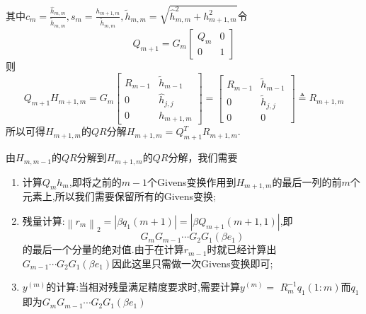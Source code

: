 \documentclass[12pt,a4paper]{article}
\begin{document}
\begin{enumerate}[(1)]
$$	$$
	其中$c_{m}=\frac{\hat{h}_{m, m}}{\tilde{h}_{m, m}}, s_{m}=\frac{h_{m+1, m}}{\tilde{h}_{m, m}}, \tilde{h}_{m, m}=\sqrt{\hat{h}_{m, m}^{2}+h_{m+1, m}^{2}}$令
	$$
	Q_{m+1}=G_{m}\left[\begin{array}{cc}{Q_{m}} & {0} \\ {0} & {1}\end{array}\right]
	$$
	则
	$$
	Q_{m+1} H_{m+1, m}=G_{m}\left[\begin{array}{cc}{R_{m-1}} & {\tilde{h}_{m-1}} \\ {0} & {\hat{h}_{j, j}} \\ {0} & {h_{m+1, m}}\end{array}\right]=\left[\begin{array}{cc}{R_{m-1}} & {\tilde{h}_{m-1}} \\ {0} & {\tilde{h}_{j, j}} \\ {0} & {0}\end{array}\right] \triangleq R_{m+1, m}
	$$
	所以可得$H_{m+1, m}$的$QR$分解$H_{m+1, m}=Q_{m+1}^{T} R_{m+1, m}$.
\end{enumerate}
由$H_{m, m-1}$的$QR$分解到$H_{m+1, m}$的$QR$分解，我们需要
\begin{enumerate}[(1)]
	\item 计算$Q_{m} h_{m}$,即将之前的$m-1$个Givens变换作用到$H_{m+1, m}$的最后一列的前$m$个元素上,所以我们需要保留所有的Givens变换;
	\item 残量计算:$\left\|r_{m}\right\|_{2}=\left|\beta q_{1}(m+1)\right|=\left|\beta Q_{m+1}(m+1,1)\right|$,即
	$$
	G_{m} G_{m-1} \cdots G_{2} G_{1}\left(\beta e_{1}\right)
	$$
	的最后一个分量的绝对值.由于在计算$r_{m-1}$时就已经计算出$G_{m-1} \cdots G_{2} G_{1}\left(\beta e_{1}\right)$因此这里只需做一次Givens变换即可;
	\item $y^{(m)}$的计算:当相对残量满足精度要求时,需要计算$y^{(m)}=$ $R_{m}^{-1} q_{1}(1 : m)$而$q_{1}$即为$G_{m} G_{m-1} \cdots G_{2} G_{1}\left(\beta e_{1}\right)$
\end{enumerate}
\end{document}

